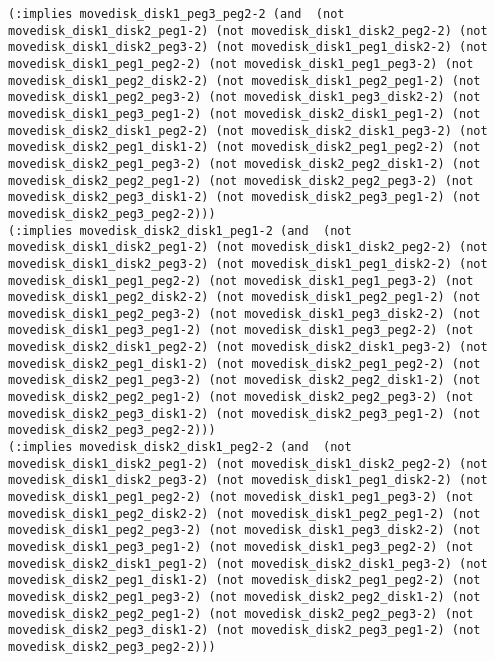 \documentclass[12pt,letterpaper]{ntdhw}
\begin{document}
\begin{enumerate}
\begin{enumerate}
\begin{lstlisting}[language=pddl, style=pddlstyle,
  basicstyle=\scriptsize]
(:implies movedisk_disk1_peg3_peg2-2 (and  (not movedisk_disk1_disk2_peg1-2) (not movedisk_disk1_disk2_peg2-2) (not movedisk_disk1_disk2_peg3-2) (not movedisk_disk1_peg1_disk2-2) (not movedisk_disk1_peg1_peg2-2) (not movedisk_disk1_peg1_peg3-2) (not movedisk_disk1_peg2_disk2-2) (not movedisk_disk1_peg2_peg1-2) (not movedisk_disk1_peg2_peg3-2) (not movedisk_disk1_peg3_disk2-2) (not movedisk_disk1_peg3_peg1-2) (not movedisk_disk2_disk1_peg1-2) (not movedisk_disk2_disk1_peg2-2) (not movedisk_disk2_disk1_peg3-2) (not movedisk_disk2_peg1_disk1-2) (not movedisk_disk2_peg1_peg2-2) (not movedisk_disk2_peg1_peg3-2) (not movedisk_disk2_peg2_disk1-2) (not movedisk_disk2_peg2_peg1-2) (not movedisk_disk2_peg2_peg3-2) (not movedisk_disk2_peg3_disk1-2) (not movedisk_disk2_peg3_peg1-2) (not movedisk_disk2_peg3_peg2-2)))
(:implies movedisk_disk2_disk1_peg1-2 (and  (not movedisk_disk1_disk2_peg1-2) (not movedisk_disk1_disk2_peg2-2) (not movedisk_disk1_disk2_peg3-2) (not movedisk_disk1_peg1_disk2-2) (not movedisk_disk1_peg1_peg2-2) (not movedisk_disk1_peg1_peg3-2) (not movedisk_disk1_peg2_disk2-2) (not movedisk_disk1_peg2_peg1-2) (not movedisk_disk1_peg2_peg3-2) (not movedisk_disk1_peg3_disk2-2) (not movedisk_disk1_peg3_peg1-2) (not movedisk_disk1_peg3_peg2-2) (not movedisk_disk2_disk1_peg2-2) (not movedisk_disk2_disk1_peg3-2) (not movedisk_disk2_peg1_disk1-2) (not movedisk_disk2_peg1_peg2-2) (not movedisk_disk2_peg1_peg3-2) (not movedisk_disk2_peg2_disk1-2) (not movedisk_disk2_peg2_peg1-2) (not movedisk_disk2_peg2_peg3-2) (not movedisk_disk2_peg3_disk1-2) (not movedisk_disk2_peg3_peg1-2) (not movedisk_disk2_peg3_peg2-2)))
(:implies movedisk_disk2_disk1_peg2-2 (and  (not movedisk_disk1_disk2_peg1-2) (not movedisk_disk1_disk2_peg2-2) (not movedisk_disk1_disk2_peg3-2) (not movedisk_disk1_peg1_disk2-2) (not movedisk_disk1_peg1_peg2-2) (not movedisk_disk1_peg1_peg3-2) (not movedisk_disk1_peg2_disk2-2) (not movedisk_disk1_peg2_peg1-2) (not movedisk_disk1_peg2_peg3-2) (not movedisk_disk1_peg3_disk2-2) (not movedisk_disk1_peg3_peg1-2) (not movedisk_disk1_peg3_peg2-2) (not movedisk_disk2_disk1_peg1-2) (not movedisk_disk2_disk1_peg3-2) (not movedisk_disk2_peg1_disk1-2) (not movedisk_disk2_peg1_peg2-2) (not movedisk_disk2_peg1_peg3-2) (not movedisk_disk2_peg2_disk1-2) (not movedisk_disk2_peg2_peg1-2) (not movedisk_disk2_peg2_peg3-2) (not movedisk_disk2_peg3_disk1-2) (not movedisk_disk2_peg3_peg1-2) (not movedisk_disk2_peg3_peg2-2)))

\end{lstlisting}
\end{enumerate}
\end{enumerate}
\end{document}
